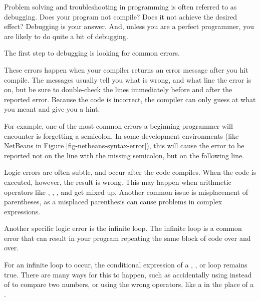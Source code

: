 Problem solving and troubleshooting in programming is often referred to as debugging. 
Does your program not compile? 
Does it not achieve the desired effect? 
Debugging is your answer. 
And, unless you are a perfect programmer, you are likely to do quite a bit of debugging.

The first step to debugging is looking for common errors.


These errors happen when your compiler returns an error message after you hit compile. 
The messages usually tell you what is wrong, and what line the error is on, but be sure to double-check the lines immediately before and after the reported error. 
Because the code is incorrect, the compiler can only guess at what you meant and give you a hint.


For example, one of the most common errors a beginning programmer will encounter is forgetting a semicolon. 
In some development environments (like NetBeans in Figure \ref{fig-netbeans-syntax-error}), this will cause the error to be reported not on the line with the missing semicolon, but on the following line. 


Logic errors are often subtle, and occur after the code compiles. 
When the code is executed, however, the result is wrong. 
This may happen when arithmetic operators like \Code{+}, \Code{-}, \Code{*}, and \Code{/} get mixed up. 
Another common issue is misplacement of parentheses, as a misplaced parenthesis can cause problems in complex expressions. 


Another specific logic error is the infinite loop. 
The infinite loop is a common error that can result in your program repeating the same block of code over and over. 

For an infinite loop to occur, the conditional expression of a , , or  loop remains true. 
There are many ways for this to happen, such as accidentally using \Code{=} instead of \Code{==} to compare two numbers, or using the wrong operators, like a \Code{>} in the place of a \Code{<}.


